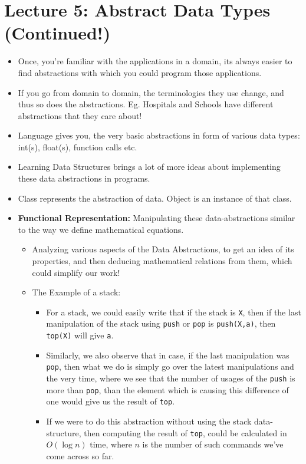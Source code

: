 \documentclass{article}
\begin{document}
\section{Lecture 5: Abstract Data Types (Continued!)}
\begin{itemize}
  \item Once, you're familiar with the applications in a domain, its always easier to find abstractions with which you could program those applications.
  \item If you go from domain to domain, the terminologies they use change, and thus so does the abstractions. Eg. Hospitals and Schools have different abstractions that they care about!
  \item Language gives you, the very basic abstractions in form of various data types: int(s), float(s), function calls etc.
  \item Learning Data Structures brings a lot of more ideas about implementing these data abstractions in programs.
  \item Class represents the abstraction of data. Object is an instance of that class.
  \item \textbf{Functional Representation:} Manipulating these data-abstractions similar to the way we define mathematical equations.
  \begin{itemize}
    \item Analyzing various aspects of the Data Abstractions, to get an idea of its properties, and then deducing mathematical relations from them, which could simplify our work!
    \item The Example of a stack:
    \begin{itemize}
    \item For a stack, we could easily write that if the stack is \verb|X|, then if the last manipulation of the stack using \verb|push| or \verb|pop| is \verb|push(X,a)|, then \verb|top(X)| will give \verb|a|.
    \item Similarly, we also observe that in case, if the last manipulation was \verb|pop|, then what we do is simply go over the latest manipulations and the very time, where we see that the number of usages of the \verb|push| is more than \verb|pop|, than the element which is causing this difference of one would give us the result of \verb|top|.
    \item If we were to do this abstraction without using the stack data-structure, then computing the result of \verb|top|, could be calculated in $O(\log n)$ time, where $n$ is the number of such commands we've come across so far.

\end{itemize}
\end{itemize}
\end{itemize}
\end{document}
